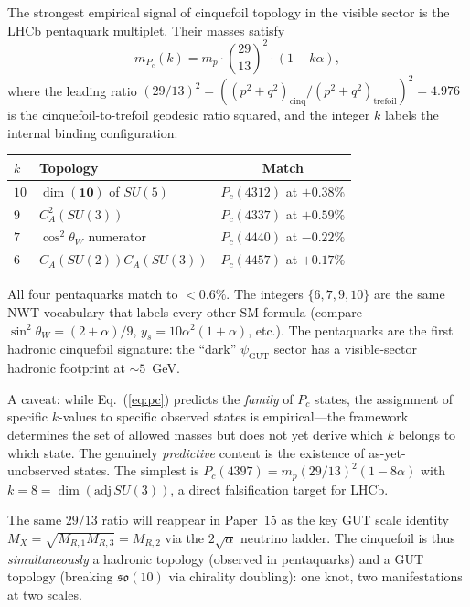 \documentclass[11pt]{article}
\newcommand{\so}{\mathfrak{so}}
\newcommand{\CA}{C_A}
\begin{document}
The strongest empirical signal of cinquefoil topology in the
visible sector is the LHCb pentaquark multiplet.  Their masses
satisfy
\begin{equation}
  m_{P_c}(k) = m_p \cdot \left(\frac{29}{13}\right)^2 \cdot
  (1 - k\alpha),
\label{eq:pc}
\end{equation}
where the leading ratio $(29/13)^2 = ((p^2+q^2)_\text{cinq}/
(p^2+q^2)_\text{trefoil})^2 = 4.976$ is the cinquefoil-to-trefoil
geodesic ratio squared, and the integer $k$ labels the internal
binding configuration:
\begin{center}
\begin{tabular}{llc}
$k$ & Topology & Match \\
\hline
$10$ & $\dim(\mathbf{10})$ of $SU(5)$ & $P_c(4312)$ at $+0.38\%$ \\
$9$  & $\CA^2(SU(3))$                  & $P_c(4337)$ at $+0.59\%$ \\
$7$  & $\cos^2\theta_W$ numerator      & $P_c(4440)$ at $-0.22\%$ \\
$6$  & $\CA(SU(2))\CA(SU(3))$          & $P_c(4457)$ at $+0.17\%$ \\
\end{tabular}
\end{center}
All four pentaquarks match to $<0.6\%$.  The integers $\{6,7,9,10\}$
are the same NWT vocabulary that labels every other SM formula
(compare $\sin^2\theta_W = (2+\alpha)/9$, $y_s = 10\alpha^2(1+\alpha)$,
etc.).  The pentaquarks are the first hadronic cinquefoil
signature: the ``dark'' $\psi_\text{GUT}$ sector has a visible-sector
hadronic footprint at $\sim 5$~GeV.

A caveat: while Eq.~(\ref{eq:pc}) predicts the \emph{family} of
$P_c$ states, the assignment of specific $k$-values to specific
observed states is empirical---the framework determines the set of
allowed masses but does not yet derive which $k$ belongs to which
state.  The genuinely \emph{predictive} content is the existence of
as-yet-unobserved states.  The simplest is
$P_c(4397) = m_p(29/13)^2(1-8\alpha)$ with $k = 8 =
\dim(\mathrm{adj}\,SU(3))$, a direct falsification target for LHCb.

The same $29/13$ ratio will reappear in Paper~15 as the key GUT
scale identity $M_X = \sqrt{M_{R,1}M_{R,3}} = M_{R,2}$ via the
$2\sqrt{\alpha}$ neutrino ladder.  The cinquefoil is thus
\emph{simultaneously} a hadronic topology (observed in
pentaquarks) and a GUT topology (breaking $\so(10)$ via chirality
doubling): one knot, two manifestations at two scales.
\end{document}
